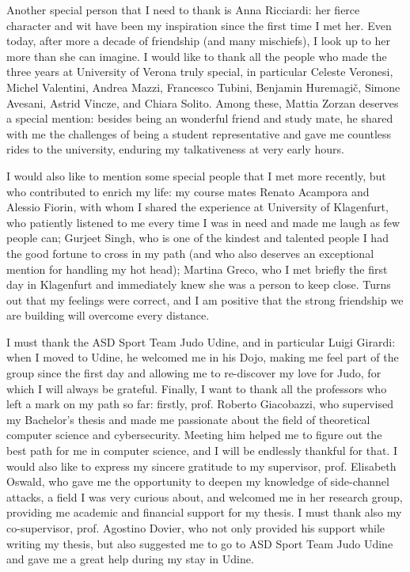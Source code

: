 \documentclass[target=mst,aauheader=aics]{thud}
\theoremstyle{definition}
\begin{document}
	Another special person that I need to thank is Anna Ricciardi: her fierce character and wit have been my inspiration since the first time I met her. Even today, after more a decade of friendship (and many mischiefs), I look up to her more than she can imagine. 
	I would like to thank all the people who made the three years at University of Verona truly special, in particular Celeste Veronesi, Michel Valentini, Andrea Mazzi, Francesco Tubini, Benjamin Huremagič, Simone Avesani, Astrid Vincze, and Chiara Solito. Among these, Mattia Zorzan deserves a special mention: besides being an wonderful friend and study mate, he shared with me the challenges of being a student representative and gave me countless rides to the university, enduring my talkativeness at very early hours. 
	
	I would also like to mention some special people that I met more recently, but who contributed to enrich my life: my course mates Renato Acampora and Alessio Fiorin, with whom I shared the experience at University of Klagenfurt, who patiently listened to me every time I was in need and made me laugh as few people can; Gurjeet Singh, who is one of the kindest and talented people I had the good fortune to cross in my path (and who also deserves an exceptional mention for handling my hot head); Martina Greco, who I met briefly the first day in Klagenfurt and immediately knew she was a person to keep close. Turns out that my feelings were correct, and I am positive that the strong friendship we are building will overcome every distance.
	
	I must thank the ASD Sport Team Judo Udine, and in particular Luigi Girardi: when I moved to Udine, he welcomed me in his Dojo, making me feel part of the group since the first day and allowing me to re-discover my love for Judo, for which I will always be grateful. 
	Finally, I want to thank all the professors who left a mark on my path so far: firstly, prof. Roberto Giacobazzi, who supervised my Bachelor's thesis and made me passionate about the field of theoretical computer science and cybersecurity. Meeting him helped me to figure out the best path for me in computer science, and I will be endlessly thankful for that. I would also like to express my sincere gratitude to my supervisor, prof. Elisabeth Oswald, who gave me the opportunity to deepen my knowledge of side-channel attacks, a field I was very curious about, and welcomed me in her research group, providing me academic and financial support for my thesis. I must thank also my co-supervisor, prof. Agostino Dovier, who not only provided his support while writing my thesis, but also suggested me to go to ASD Sport Team Judo Udine and gave me a great help during my stay in Udine.
	
\end{document}
